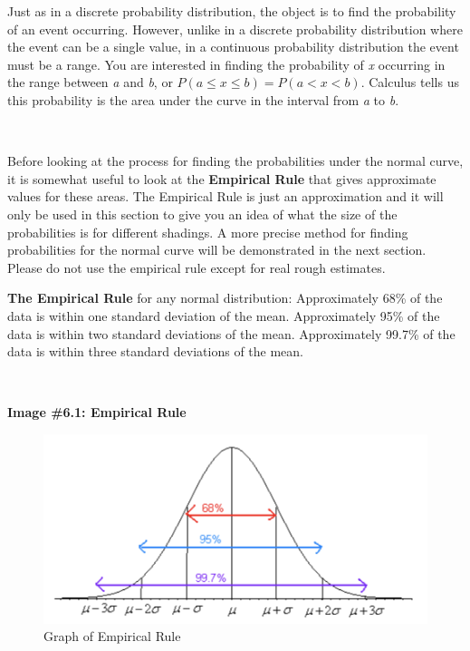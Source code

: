\documentclass[
]{book}
\begin{document}
Just as in a discrete probability distribution, the object is to find the probability of an event occurring. However, unlike in a discrete probability distribution where the event can be a single value, in a continuous probability distribution the event must be a range. You are interested in finding the probability of \emph{x} occurring in the range between \emph{a} and \emph{b}, or \(P(a \le x \le b) = P(a<x<b)\). Calculus tells us this probability is the area under the curve in the interval from \emph{a} to \emph{b}.

\textbf{\\
}

Before looking at the process for finding the probabilities under the normal curve, it is somewhat useful to look at the \textbf{Empirical Rule} that gives approximate values for these areas. The Empirical Rule is just an approximation and it will only be used in this section to give you an idea of what the size of the probabilities is for different shadings. A more precise method for finding probabilities for the normal curve will be demonstrated in the next section. Please do not use the empirical rule except for real rough estimates.

\textbf{The Empirical Rule} for any normal distribution:
Approximately 68\% of the data is within one standard deviation of the mean.
Approximately 95\% of the data is within two standard deviations of the mean.
Approximately 99.7\% of the data is within three standard deviations of the mean.

\textbf{\\
}

\textbf{Image \#6.1: Empirical Rule}

\begin{figure}
\centering
\includegraphics{Empirical_rule.png}
\caption{Graph of Empirical Rule}
\end{figure}
\end{document}
